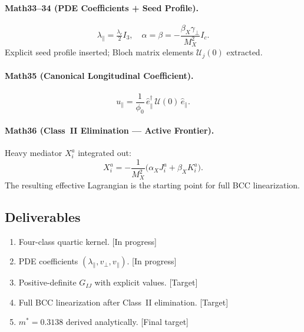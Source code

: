 \documentclass[11pt,a4paper]{article}
\newcommand{\mstar}{m^{*}}
\begin{document}
\paragraph{Math33--34 (PDE Coefficients + Seed Profile).}
\begin{equation}
\lambda_{\parallel}=\tfrac{\lambda_{c}}{2}I_{3},\quad
\alpha=\beta=-\frac{\beta_{X}\gamma_{\perp}}{M_{X}^{2}}I_{c}.
\end{equation}
Explicit seed profile inserted; Bloch matrix elements $\mathcal{U}_{j}(0)$ extracted.

\paragraph{Math35 (Canonical Longitudinal Coefficient).}
\begin{equation}
u_{\parallel}=\frac{1}{\phi_{0}}\,\hat{e}_{\parallel}^{\dagger}\,\mathcal{U}(0)\,\hat{e}_{\parallel}.
\end{equation}

\paragraph{Math36 (Class~II Elimination --- Active Frontier).}
Heavy mediator $X_{i}^{a}$ integrated out:
\begin{equation}
X_{i}^{a}=-\frac{1}{M_{X}^{2}}
\bigl(\alpha_{X}J_{i}^{a}+\beta_{X}K_{i}^{a}\bigr).
\label{eq:Xelim}
\end{equation}
The resulting effective Lagrangian is the starting point for full BCC linearization.

\subsection{Deliverables}
\begin{enumerate}
\item Four-class quartic kernel. \hfill\textcolor{orange!80!black}{[In progress]}
\item PDE coefficients $(\lambda_{\parallel},v_{\perp},v_{\parallel})$. \hfill\textcolor{orange!80!black}{[In progress]}
\item Positive-definite $G_{IJ}$ with explicit values. \hfill\textcolor{red!70!black}{[Target]}
\item Full BCC linearization after Class~II elimination. \hfill\textcolor{red!70!black}{[Target]}
\item $\mstar=0.3138$ derived analytically. \hfill\textcolor{red!70!black}{[Final target]}
\end{enumerate}
\end{document}
